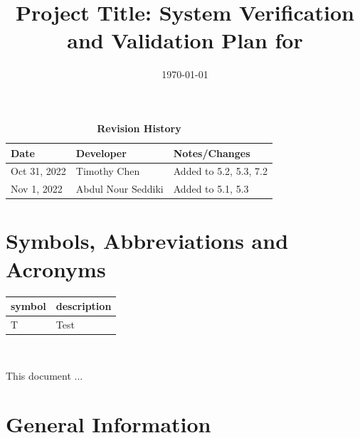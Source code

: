\documentclass[12pt, titlepage]{article}
\begin{document}
\title{Project Title: System Verification and Validation Plan for \progname{}} 
\author{\authname}
\date{\today}
	
\maketitle


\begin{table}[H]
  \caption{\bf Revision History}
  \begin{tabularx}{\textwidth}{p{2.5cm}p{2.5cm}X}
  \toprule {\bf Date} & {\bf Developer} & {\bf Notes/Changes}\\
  \midrule
  Oct 31, 2022 & Timothy Chen & Added to 5.2, 5.3, 7.2\\
  Nov 1, 2022 & Abdul Nour Seddiki & Added to 5.1, 5.3\\
  \bottomrule
  \end{tabularx}
  \end{table}
  

\newpage

\tableofcontents

\listoftables
{}

\listoffigures
{}

\newpage

\section{Symbols, Abbreviations and Acronyms}

\renewcommand{\arraystretch}{1.2}
\begin{tabular}{l l} 
  \toprule		
  \textbf{symbol} & \textbf{description}\\
  \midrule 
  T & Test\\
  \bottomrule
\end{tabular}\\


\newpage


This document ... 

\section{General Information}
\end{document}
